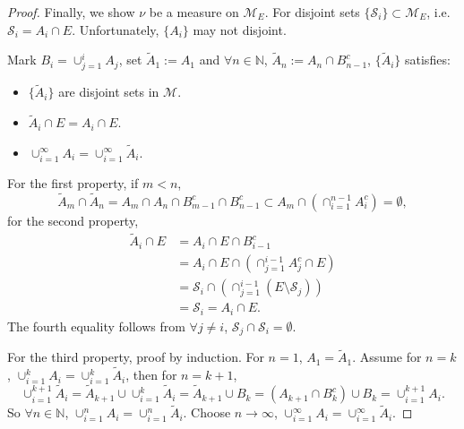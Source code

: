 \documentclass{article}
\newcommand{\Sc}{\mathcal{S}}
\newcommand{\cp}[2]{\cup_{#1=1}^{#2}}
\newcommand{\M}{\mathcal{M}}
\begin{document}
\begin{proof}
    Finally, we show $\nu$ be a measure on $\M_{E}$. 
    For disjoint sets $\{\Sc_{i}\}\subset\M_{E}$, 
    i.e. $\Sc_{i}=A_{i}\cap E$. Unfortunately, 
    $\{A_{i}\}$ may not disjoint.
    
    Mark $B_{i}=\cp{j}{i}A_{j}$, 
    set $\tilde{A}_{1}:=A_{1}$ and 
    $\forall n\in\mathbb{N}$, $\tilde{A}_{n}:=A_{n}\cap B_{n-1}^{c}$, 
    $\{\tilde{A}_{i}\}$ satisfies:
    \begin{itemize}
        \item $\{\tilde{A}_{i}\}$ are disjoint sets in $\M$.
        \item $\tilde{A}_{i}\cap E=A_{i}\cap E$.
        \item $\cp{i}{\infty}A_{i}=\cp{i}{\infty}\tilde{A}_{i}$.
    \end{itemize}
    For the first property, if $m<n$, 
    \begin{displaymath}
        \tilde{A}_{m}\cap\tilde{A}_{n}
        =A_{m}\cap A_{n}\cap B_{m-1}^{c}\cap B_{n-1}^{c}
        \subset A_{m}\cap(\cap_{i=1}^{n-1}A_{i}^{c})
        =\emptyset,
    \end{displaymath}
    for the second property, 
    \begin{displaymath}
        \begin{array}{rl}
        \tilde{A}_{i}\cap E&=A_{i}\cap E\cap B_{i-1}^{c}\\
        &=A_{i}\cap E\cap (\cap_{j=1}^{i-1}A_{j}^{c}\cap E)\\
        &=\mathcal{S}_{i}\cap(\cap_{j=1}^{i-1}(E\setminus \mathcal{S}_{j}))\\
        &=\mathcal{S}_{i}=A_{i}\cap E.
        \end{array}
    \end{displaymath}
    The fourth equality follows from 
    $\forall j\neq i$, $\mathcal{S}_{j}\cap\mathcal{S}_{i}=\emptyset$. 

    For the third property, proof by induction. For $n=1$, $A_{1}=\tilde{A}_{1}$.
    Assume for $n=k$, $\cp{i}{k}A_{i}=\cp{i}{k}\tilde{A}_{i}$, 
    then for $n=k+1$, 
    \begin{displaymath}
        \cp{i}{k+1}\tilde{A}_{i}
        =\tilde{A}_{k+1}\cup\cp{i}{k}\tilde{A}_{i}
        =\tilde{A}_{k+1}\cup B_{k}
        =(A_{k+1}\cap B_{k}^{c})\cup B_{k}
        =\cp{i}{k+1}A_{i}.
    \end{displaymath}
    So $\forall n\in\mathbb{N}$, 
    $\cp{i}{n}A_{i}=\cp{i}{n}\tilde{A}_{i}$. 
    Choose $n\rightarrow\infty$, 
    $\cp{i}{\infty}A_{i}=\cp{i}{\infty}\tilde{A}_{i}$. 


\end{proof}
\end{document}
